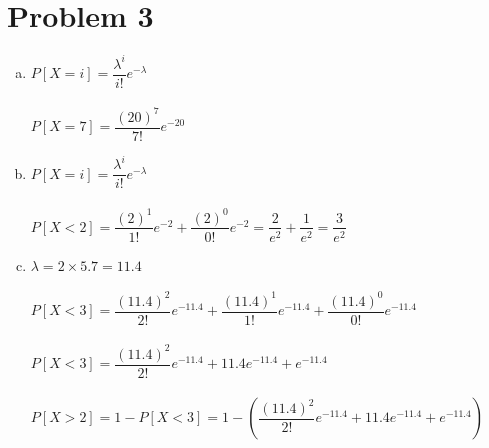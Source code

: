 \documentclass[11pt,letterpaper]{article}
\begin{document}
\section*{Problem 3}
\begin{enumerate}[(a)]
\item
$P[X=i]=\dfrac{\lambda^i}{i!}e^{-\lambda}$\\\\
$P[X=7]=\dfrac{(20)^7}{7!}e^{-20}$\\
\item
$P[X=i]=\dfrac{\lambda^i}{i!}e^{-\lambda}$\\\\
$P[X<2]=\dfrac{(2)^1}{1!}e^{-2} + \dfrac{(2)^0}{0!}e^{-2}= \dfrac{2}{e^2} + \dfrac{1}{e^2} = \dfrac{3}{e^2}$\\
\item
$\lambda = 2\times 5.7 = 11.4$\\\\

$P[X<3]=\dfrac{(11.4)^2}{2!}e^{-11.4} + \dfrac{(11.4)^1}{1!}e^{-11.4} + \dfrac{(11.4)^0}{0!}e^{-11.4}$\\\\
$P[X<3]=\dfrac{(11.4)^2}{2!}e^{-11.4} + 11.4e^{-11.4} + e^{-11.4}$\\\\
$P[X>2] = 1 - P[X<3] = 1 - \left(\dfrac{(11.4)^2}{2!}e^{-11.4} + 11.4e^{-11.4} + e^{-11.4}\right)$
\end{enumerate}
\clearpage
\end{document}
